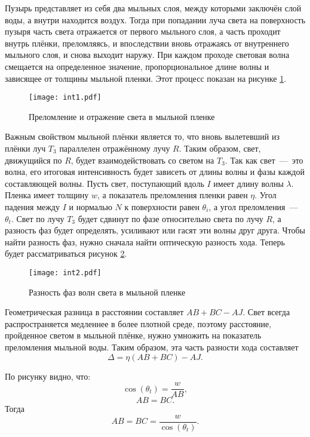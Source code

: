 Пузырь представляет из себя два мыльных слоя, между которыми заключён слой воды, а внутри находится воздух. Тогда при попадании луча света на поверхность пузыря часть света отражается от первого мыльного слоя, а часть проходит внутрь плёнки, преломляясь, и впоследствии вновь отражаясь от внутреннего мыльного слоя, и снова выходит наружу. При каждом проходе световая волна смещается на определенное значение, пропорциональное длине волны и зависящее от толщины мыльной пленки. Этот процесс показан на рисунке \ref{img:int1}.

\newpage

\begin{figure}[h!]
    \centering
    \texttt{[image: int1.pdf]}
    \caption{Преломление и отражение света в мыльной пленке}
    \label{img:int1}
\end{figure}

Важным свойством мыльной плёнки является то, что вновь вылетевший из плёнки луч $T_3$ параллелен отражённому лучу $R$. Таким образом, свет, движущийся по $R$, будет взаимодействовать со светом на $T_3$. Так как свет~---~это волна, его итоговая интенсивность будет зависеть от длины волны и фазы каждой составляющей волны. Пусть свет, поступающий вдоль $I$ имеет длину волны $\lambda$. Пленка имеет толщину $w$, а показатель преломления пленки равен $\eta$. Угол падения между $I$ и нормалью $N$ к поверхности равен $\theta_i$, а угол преломления~---~$\theta_t$. Свет по лучу $T_3$ будет сдвинут по фазе относительно света по лучу $R$, а разность фаз будет определять, усиливают или гасят эти волны друг друга. Чтобы найти разность фаз, нужно сначала найти оптическую разность хода. Теперь будет рассматриваться рисунок \ref{img:int2}.

\begin{figure}[h!]
    \centering
    \texttt{[image: int2.pdf]}
    \caption{Разность фаз волн света в мыльной пленке}
    \label{img:int2}
\end{figure}

Геометрическая разница в расстоянии составляет $AB + BC - AJ$. Свет всегда распространяется медленнее в более плотной среде, поэтому расстояние, пройденное светом в мыльной плёнке, нужно умножить на показатель преломления мыльной воды. Таким образом, эта часть разности хода составляет 
\begin{equation} \label{eqn:1}
	\Delta = \eta(AB + BC) - AJ. 
\end{equation}

По рисунку видно, что:
\begin{equation}
	\cos(\theta_t) = \frac{w}{AB},
\end{equation}
\begin{equation}
	AB = BC.
\end{equation}
Тогда
\begin{equation}
	AB = BC = \frac{w}{\cos(\theta_t)}.
\end{equation}

